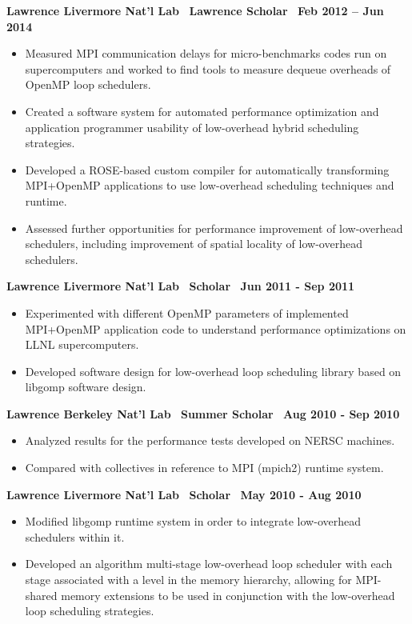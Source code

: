 \textbf{Lawrence Livermore Nat’l Lab$\>$$\>$$\>$$\>$Lawrence Scholar$\>$$\>$$\>$$\>$Feb 2012 – Jun 2014}
\vspace*{-0.0in}
\begin{itemize} 
\item Measured MPI communication delays for micro-benchmarks codes run on supercomputers and worked to find tools to measure dequeue overheads of OpenMP loop schedulers.
\item Created a software system for automated performance optimization and application programmer usability of low-overhead hybrid scheduling
strategies.
\item Developed a ROSE-based custom compiler for automatically transforming MPI+OpenMP applications to use low-overhead scheduling
techniques and runtime.
\item Assessed further opportunities for performance improvement of low-overhead schedulers, including improvement of spatial locality
of low-overhead schedulers.
\end{itemize}

\textbf{Lawrence Livermore Nat’l Lab$\>$$\>$$\>$$\>$Scholar$\>$$\>$$\>$$\>$Jun 2011 - Sep 2011}
\vspace*{-0.0in}
\begin{itemize} 
\item Experimented with different OpenMP parameters of implemented MPI+OpenMP application code to understand performance optimizations on
LLNL supercomputers.
\item Developed software design for low-overhead loop scheduling library based on libgomp software design.
\end{itemize} 

\textbf{Lawrence Berkeley Nat’l Lab$\>$$\>$$\>$$\>$Summer Scholar$\>$$\>$$\>$$\>$Aug 2010 - Sep 2010}
\begin{itemize}
\item Analyzed results for the performance tests developed on NERSC machines.
\item Compared with collectives in reference to MPI (mpich2) runtime system.
\end{itemize}

\textbf{Lawrence Livermore Nat’l Lab$\>$$\>$$\>$$\>$Scholar$\>$$\>$$\>$$\>$May 2010 - Aug 2010}
\begin{itemize}
\item Modified libgomp runtime system in order to integrate low-overhead schedulers within it.
\item Developed an algorithm multi-stage low-overhead loop scheduler with each stage associated with a level in the memory hierarchy, allowing for MPI-shared memory extensions to be used in conjunction with the low-overhead loop scheduling strategies.
\end{itemize}

